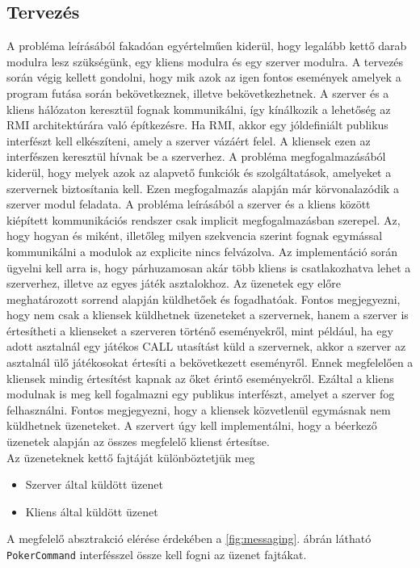 \subsection{Tervezés}
A probléma leírásából fakadóan egyértelműen kiderül, hogy legalább kettő darab modulra lesz szükségünk, egy kliens modulra és egy szerver modulra. 
A tervezés során végig kellett gondolni, hogy mik azok az igen fontos események amelyek a program futása során bekövetkeznek, illetve bekövetkezhetnek. A szerver és a kliens hálózaton keresztül fognak kommunikálni, így kínálkozik a lehetőség az RMI architektúrára való építkezésre. Ha RMI, akkor egy jóldefiniált publikus interfészt kell elkészíteni, amely a szerver vázáért felel. A kliensek ezen az interfészen keresztül hívnak be a szerverhez. A probléma megfogalmazásából kiderül, hogy melyek azok az alapvető funkciók és szolgáltatások, amelyeket a szervernek biztosítania kell. Ezen megfogalmazás alapján már körvonalazódik a szerver modul feladata. A probléma leírásából a szerver és a kliens között kiépített kommunikációs rendszer csak implicit megfogalmazásban szerepel. Az, hogy hogyan és miként, illetőleg milyen szekvencia szerint fognak egymással kommunikálni a modulok az explicite nincs felvázolva. Az implementáció során ügyelni kell arra is, hogy párhuzamosan akár több kliens is csatlakozhatva lehet a szerverhez, illetve az egyes játék asztalokhoz. Az üzenetek egy előre meghatározott sorrend alapján küldhetőek és fogadhatóak. Fontos megjegyezni, hogy nem csak a kliensek küldhetnek üzeneteket a szervernek, hanem a szerver is értesítheti a klienseket a szerveren történő eseményekről, mint például, ha egy adott asztalnál egy játékos CALL utasítást küld a szervernek, akkor a szerver az asztalnál ülő játékosokat értesíti a bekövetkezett eseményről. Ennek megfelelően a kliensek mindig értesítést kapnak az őket érintő eseményekről. Ezáltal a kliens modulnak is meg kell fogalmazni egy publikus interfészt, amelyet a szerver fog felhasználni. Fontos megjegyezni, hogy a kliensek közvetlenül egymásnak nem küldhetnek üzeneteket. A szervert úgy kell implementálni, hogy a béerkező üzenetek alapján az összes megfelelő klienst értesítse. \\
Az üzeneteknek kettő fajtáját különböztetjük meg
 \begin{itemize}[leftmargin=2.7cm]
\item Szerver által küldött üzenet
\item Kliens által küldött üzenet
\end{itemize}
A megfelelő absztrakció elérése érdekében a \ref{fig:messaging}. ábrán látható \texttt{PokerCommand} interfésszel össze kell fogni az üzenet fajtákat.
